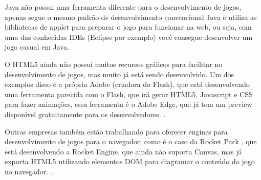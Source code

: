 Java não possui uma ferramenta diferente para o desenvolvimento de
jogos, apenas segue o mesmo padrão de desenvolvimento convencional
Java e utiliza as bibliotecas de applet para preparar o jogo para
funcionar na web, ou seja, com uma das conhecidas IDEs (Eclipse por
exemplo) você consegue desenvolver um jogo casual em Java.

O HTML5 ainda não possui muitos recursos gráficos para facilitar no
desenvolvimento de jogos, mas muito já está sendo desenvolvido. Um dos
exemplos disso é a própria Adobe (criadora do Flash), que está
desenvolvendo uma ferramenta parecida com o Flash, que irá gerar
HTML5, Javascript e CSS para fazer animações, essa ferramenta é o
Adobe Edge, que já tem um preview disponível
gratuitamente para os desenvolvedores. \cite{website:adobeedge}.

Outras empresas também estão trabalhando para oferecer engines para
desenvolvimento de jogos para o navegador, como é o caso da Rocket
Pack \cite{website:rocketpack}, que está desenvolvendo a Rocket Engine,
que ainda não suporta Canvas, mas já
exporta HTML5 utilizando elementos DOM para diagramar o conteúdo do
jogo no navegador. \cite{website:rocketengine}.
